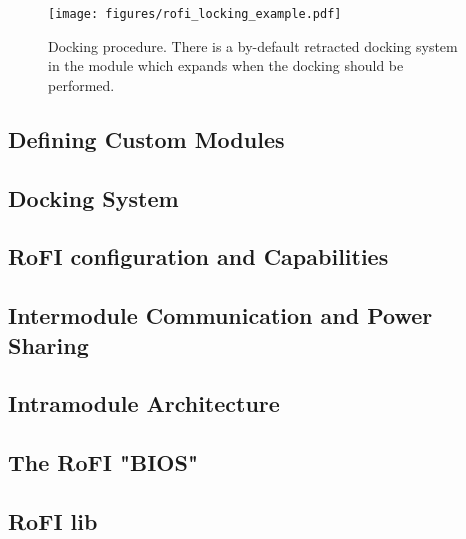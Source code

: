 \begin{figure}
    \centering
    \texttt{[image: figures/rofi\_locking\_example.pdf]}
    \caption{Docking procedure. There is a by-default retracted docking system
    in the module which expands when the docking should be performed.}
    \label{fig:rofi_locking_example}
\end{figure}


\subsection{Defining Custom Modules}\label{subsec:custom_modules}

\subsection{Docking System}\label{subsec:lock}

\subsection{RoFI configuration and Capabilities}

\subsection{Intermodule Communication and Power Sharing}

\subsection{Intramodule Architecture}

\subsection{The RoFI "BIOS" }

\subsection{RoFI lib}


